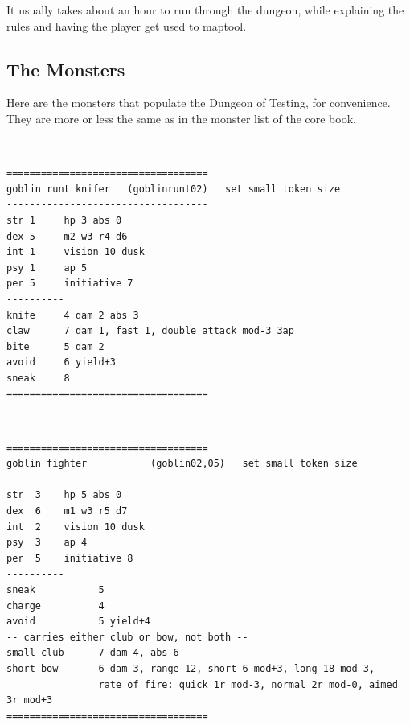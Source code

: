 It usually takes about an hour to run through the dungeon, while explaining the rules and having the player get used to maptool.












\subsection*{The Monsters}

Here are the monsters that populate the Dungeon of Testing, for convenience. They are more or less the same as in the monster list of the core book.

\

\goodbreak \begin{samepage} \small \begin{verbatim}
===================================
goblin runt knifer   (goblinrunt02)   set small token size
-----------------------------------
str 1     hp 3 abs 0
dex 5     m2 w3 r4 d6
int 1     vision 10 dusk
psy 1     ap 5
per 5     initiative 7
----------
knife     4 dam 2 abs 3
claw      7 dam 1, fast 1, double attack mod-3 3ap
bite      5 dam 2
avoid     6 yield+3
sneak     8
===================================
\end{verbatim} \normalsize \end{samepage}

\

\goodbreak \begin{samepage} \small \begin{verbatim}
===================================
goblin fighter           (goblin02,05)   set small token size
-----------------------------------
str  3    hp 5 abs 0
dex  6    m1 w3 r5 d7
int  2    vision 10 dusk
psy  3    ap 4
per  5    initiative 8
----------
sneak           5
charge          4
avoid           5 yield+4
-- carries either club or bow, not both --
small club      7 dam 4, abs 6
short bow       6 dam 3, range 12, short 6 mod+3, long 18 mod-3,
                rate of fire: quick 1r mod-3, normal 2r mod-0, aimed 3r mod+3
===================================
\end{verbatim} \normalsize \end{samepage}

